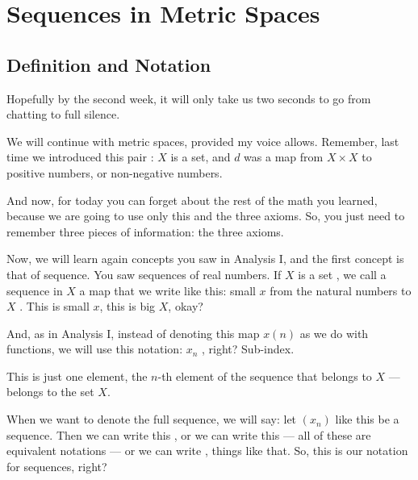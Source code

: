 \section{Sequences in Metric Spaces}

\subsection{Definition and Notation}

\begin{speech}[00:00:00 - 00:01:45]
Hopefully by the second week, it will only take us two seconds to go from chatting to full silence.

We will continue with metric spaces, provided my voice allows. Remember, last time we introduced this pair : $X$ is a set, and $d$ was a map from $X \times X$ to positive numbers, or non-negative numbers.

And now, for today you can forget about the rest of the math you learned, because we are going to use only this and the three axioms. So, you just need to remember three pieces of information: the three axioms.

Now, we will learn again concepts you saw in Analysis I, and the first concept is that of sequence.  You saw sequences of real numbers. If $X$ is a set , we call a sequence in $X$ a map  that we write like this: small $x$ from the natural numbers to $X$ . This is small $x$, this is big $X$, okay?
\end{speech}

\begin{speech}[00:01:45 - 00:02:55]
And, as in Analysis I, instead of denoting this map $x(n)$  as we do with functions, we will use this notation: $x_n$ , right? Sub-index.

This is just one element, the $n$-th element of the sequence  that belongs to $X$  --- belongs to the set $X$.

When we want to denote the full sequence, we will say: let $(x_n)$ like this be a sequence. Then we can write this , or we can write this  --- all of these are equivalent notations --- or we can write , things like that. So, this is our notation for sequences, right? 
\end{speech}

